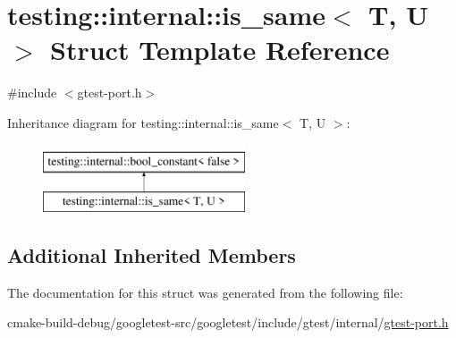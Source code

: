 \hypertarget{structtesting_1_1internal_1_1is__same}{}\section{testing\+::internal\+::is\+\_\+same$<$ T, U $>$ Struct Template Reference}
\label{structtesting_1_1internal_1_1is__same}


{\ttfamily \#include $<$gtest-\/port.\+h$>$}

Inheritance diagram for testing\+::internal\+::is\+\_\+same$<$ T, U $>$\+:\begin{figure}[H]
\begin{center}
\leavevmode
\includegraphics[height=2.000000cm]{structtesting_1_1internal_1_1is__same}
\end{center}
\end{figure}
\subsection*{Additional Inherited Members}


The documentation for this struct was generated from the following file\+:\begin{DoxyCompactItemize}
\item 
cmake-\/build-\/debug/googletest-\/src/googletest/include/gtest/internal/\mbox{\hyperlink{gtest-port_8h}{gtest-\/port.\+h}}\end{DoxyCompactItemize}
